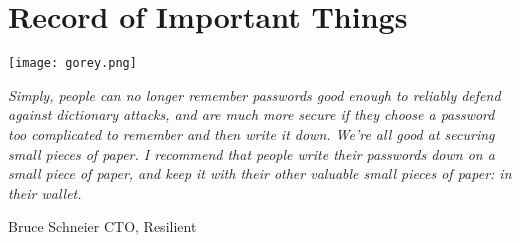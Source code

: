 \documentclass[12pt]{book}
\begin{document}



\newpage

\chapter*{Record of Important Things}

\begin{center}
	\texttt{[image: gorey.png]}
\end{center}

\begin{small}
\textit{Simply, people can no longer remember passwords good enough to reliably defend against dictionary attacks, and are much more secure if they choose a password too complicated to remember and then write it down. We're all good at securing small pieces of paper. I recommend that people write their passwords down on a small piece of paper, and keep it with their other valuable small pieces of paper: in their wallet.}
\begin{flushright}{Bruce Schneier CTO, Resilient}\end{flushright}
\end{small}



\clearpage
{}
\pagestyle{headings}



























































\cleardoublepage

\newpage
{}
\fontsize{7}{3mm}\selectfont
\begin{multicols}{4}
	\noindent
\end{multicols}
\restoregeometry




\end{document}
